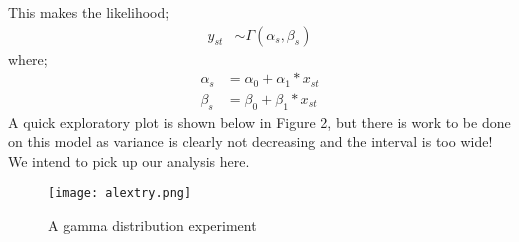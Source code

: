 \documentclass{article}
\begin{document}
This makes the likelihood;
\begin{align*}
y_{st} &\sim \Gamma(\alpha_s,\beta_s)
\end{align*}
where;
\begin{align*}
\alpha_s &= \alpha_0 + \alpha_1*x_{st}\\
\beta_s &= \beta_0 + \beta_1*x_{st}
\end{align*}
A quick exploratory plot is shown below in Figure 2, but there is work to be done on this model as variance is clearly not decreasing and the interval is too wide! We intend to pick up our analysis here.
 \begin{figure}[H]
\centering
\texttt{[image: alextry.png]}
\caption{A gamma distribution experiment}
\label{deltat}
\end{figure}
\end{document}
